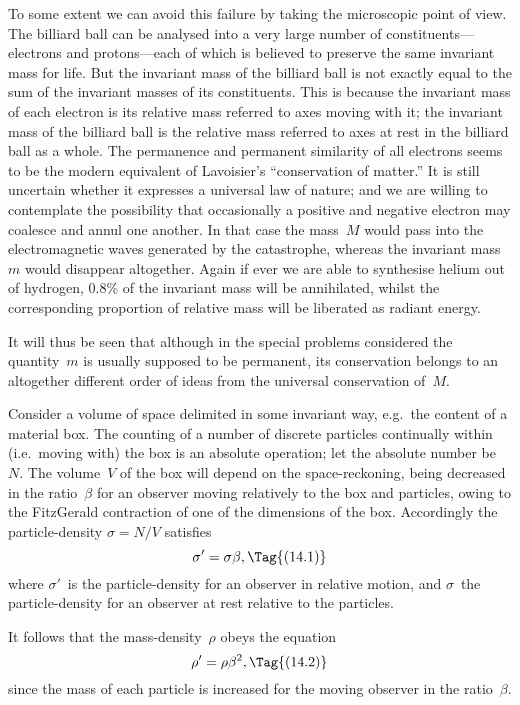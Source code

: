 \documentclass[12pt]{book}
\begin{document}
To some extent we can avoid this failure by taking the microscopic point
of view. The billiard ball can be analysed into a very large number of constituents---electrons
and protons---each of which is believed to preserve the
same invariant mass for life. But the invariant mass of the billiard ball is
not exactly equal to the sum of the invariant masses of its constituents\footnotemark.\footnotetext
  {This is because the invariant mass of each electron is its relative mass referred to axes
  moving with it; the invariant mass of the billiard ball is the relative mass referred to axes at rest
  in the billiard ball as a whole.}
The permanence and permanent similarity of all electrons seems to be the
modern equivalent of Lavoisier's ``conservation of matter.'' It is still uncertain
whether it expresses a universal law of nature; and we are willing to contemplate
the possibility that occasionally a positive and negative electron
may coalesce and annul one another. In that case the mass~$M$ would pass
into the electromagnetic waves generated by the catastrophe, whereas the
invariant mass~$m$ would disappear altogether. Again if ever we are able to
synthesise helium out of hydrogen, 0.8\% of the invariant mass will
be annihilated, whilst the corresponding proportion of relative mass will be
liberated as radiant energy.

It will thus be seen that although in the special problems considered the
quantity~$m$ is usually supposed to be permanent, its conservation belongs to
an altogether different order of ideas from the universal conservation of~$M$.

%

Consider a volume of space delimited in some invariant way, e.g.\ the
content of a material box. The counting of a number of discrete particles
continually within (i.e.\ moving with) the box is an absolute operation; let
the absolute number be~$N$. The volume~$V$ of the box will depend on the
space\hyp{}reckoning, being decreased in the ratio~$\beta$ for an observer moving
relatively to the box and particles, owing to the FitzGerald contraction of one
of the dimensions of the box. Accordingly the particle\hyp{}density $\sigma = N/V$
satisfies
\[
\sigma' = \sigma\beta,
\Tag{(14.1)}
\]
where $\sigma'$~is the particle\hyp{}density for an observer in relative motion, and $\sigma$~the
particle\hyp{}density for an observer at rest relative to the particles.

It follows that the mass\hyp{}density~$\rho$ obeys the equation
\[
\rho' = \rho\beta^2,
\Tag{(14.2)}
\]
since the mass of each particle is increased for the moving observer in the
ratio~$\beta$.
\end{document}
